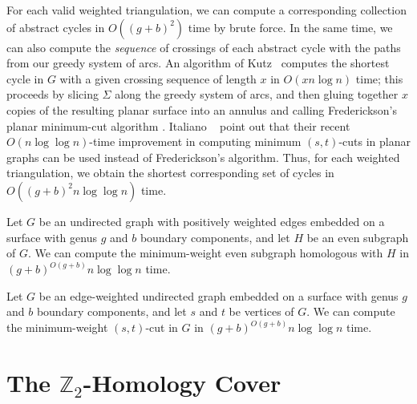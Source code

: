 \documentclass[letterpaper,review]{siamart190516}
\def\Z{\mathbb{Z}}
\begin{document}
For each valid weighted triangulation, we can compute a corresponding collection of abstract cycles in $O((g+b)^2)$ time by brute force.  In the same time, we can also compute the \emph{sequence} of crossings of each abstract cycle with the paths from our greedy system of arcs.  An algorithm of Kutz~\cite{k-csnco-06} computes the shortest cycle in $G$ with a given crossing sequence of length $x$ in $O(x n \log n)$ time; this proceeds by slicing $\Sigma$ along the greedy system of arcs, and then gluing together $x$ copies of the resulting planar surface into an annulus and calling Frederickson's planar minimum-cut algorithm \cite{f-faspp-87}.
Italiano \etal~\cite{insw-iamcmf-11} point out that their recent $O(n \log \log n)$-time improvement in computing minimum $(s,t)$-cuts in planar graphs can be used instead of Frederickson's algorithm. 
Thus, for each weighted triangulation, we obtain the shortest corresponding set of cycles in $O((g+b)^2 n \log \log n)$ time.

\begin{theorem}
\label{Th:Z2-minimal-crossing}
Let $G$ be an undirected graph with positively weighted edges embedded on a surface with genus $g$ and $b$ boundary components, and let $H$ be an even subgraph of $G$. We can compute the minimum-weight even subgraph homologous with $H$ in $(g+b)^{O(g+b)} n\log \log n$ time.
\end{theorem}

\begin{corollary}
\label{C:min-cut-crossing}
Let $G$ be an edge-weighted undirected graph embedded on a surface with genus $g$ and $b$ boundary components, and let $s$ and $t$ be vertices of $G$.  We can compute the minimum-weight $(s,t)$-cut in $G$ in $(g+b)^{O(g+b)} n\log \log n$ time.
\end{corollary}

\section{The $\Z_2$-Homology Cover}
\label{sec:homcover}
\end{document}
